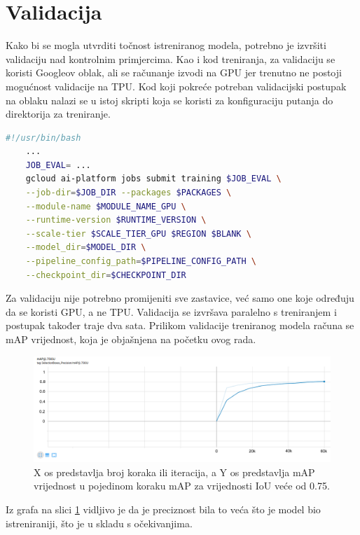 \section{Validacija}
Kako bi se mogla utvrditi točnost istreniranog modela, potrebno je izvršiti validaciju nad kontrolnim primjercima. Kao i kod treniranja, za validaciju se koristi Googleov oblak, ali se računanje izvodi
na GPU jer trenutno ne postoji mogućnost validacije na TPU. Kod koji pokreće potreban validacijski postupak na oblaku nalazi se u istoj skripti koja se koristi za konfiguraciju putanja do direktorija za treniranje.

\begin{lstlisting}[language=bash, tabsize=2]
    #!/usr/bin/bash
    ...
    JOB_EVAL= ...
    gcloud ai-platform jobs submit training $JOB_EVAL \
    --job-dir=$JOB_DIR --packages $PACKAGES \
    --module-name $MODULE_NAME_GPU \
    --runtime-version $RUNTIME_VERSION \
    --scale-tier $SCALE_TIER_GPU $REGION $BLANK \
    --model_dir=$MODEL_DIR \
    --pipeline_config_path=$PIPELINE_CONFIG_PATH \
    --checkpoint_dir=$CHECKPOINT_DIR
\end{lstlisting}

Za validaciju nije potrebno promijeniti sve zastavice, već samo one koje određuju da se koristi GPU, a ne TPU. Validacija se izvršava paralelno s treniranjem i postupak također traje dva sata.
Prilikom validacije treniranog modela računa se mAP vrijednost, koja je objašnjena na početku ovog rada. 

\begin{figure}[htb]
    \centering
    \includegraphics[width=14cm]{img/eval-mAP.png}
    \caption{X os predstavlja broj koraka ili iteracija, a Y os predstavlja mAP vrijednost u pojedinom koraku mAP za vrijednosti IoU veće od 0.75.}
    \label{Eval-mAP}
\end{figure}


Iz grafa na slici \ref{Eval-mAP} vidljivo je da je preciznost bila to veća što je model bio istreniraniji, što je u skladu s očekivanjima. 

